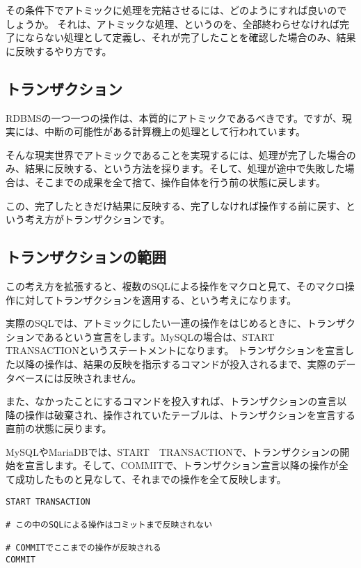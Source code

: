 その条件下でアトミックに処理を完結させるには、どのようにすれば良いのでしょうか。
それは、アトミックな処理、というのを、全部終わらせなければ完了にならない処理として定義し、それが完了したことを確認した場合のみ、結果に反映するやり方です。

\subsection{トランザクション}

RDBMSの一つ一つの操作は、本質的にアトミックであるべきです。ですが、現実には、中断の可能性がある計算機上の処理として行われています。

そんな現実世界でアトミックであることを実現するには、処理が完了した場合のみ、結果に反映する、という方法を採ります。そして、処理が途中で失敗した場合は、そこまでの成果を全て捨て、操作自体を行う前の状態に戻します。

この、完了したときだけ結果に反映する、完了しなければ操作する前に戻す、という考え方がトランザクションです。

\subsection{トランザクションの範囲}

この考え方を拡張すると、複数のSQLによる操作をマクロと見て、そのマクロ操作に対してトランザクションを適用する、という考えになります。

実際のSQLでは、アトミックにしたい一連の操作をはじめるときに、トランザクションであるという宣言をします。MySQLの場合は、START　TRANSACTIONというステートメントになります。
トランザクションを宣言した以降の操作は、結果の反映を指示するコマンドが投入されるまで、実際のデータベースには反映されません。

また、なかったことにするコマンドを投入すれば、トランザクションの宣言以降の操作は破棄され、操作されていたテーブルは、トランザクションを宣言する直前の状態に戻ります。

MySQLやMariaDBでは、START　TRANSACTIONで、トランザクションの開始を宣言します。そして、COMMITで、トランザクション宣言以降の操作が全て成功したものと見なして、それまでの操作を全て反映します。

\begin{verbatim}
START TRANSACTION

# この中のSQLによる操作はコミットまで反映されない

# COMMITでここまでの操作が反映される
COMMIT
\end{verbatim}

